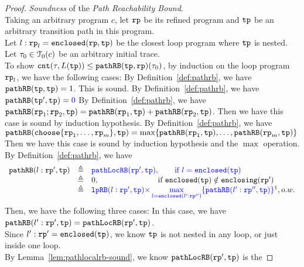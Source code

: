 \begin{proof}
\emph{Soundness} of the \emph{Path Reachability Bound}.
\\
Taking an arbitrary program $c$, let $\mathtt{rp}$ be its refined program and $\mathtt{tp}$ be an arbitrary transition path in this program.
\\
Let $l: \mathtt{rp}_l = \mathtt{enclosed}(\mathtt{rp}, \mathtt{tp})$ be the closest loop program where $\mathtt{tp}$ is nested.
\\
Let $\mathtt{\tau}_0 \in \mathcal{T}_0(c)$ be an arbitrary initial trace.
\\
To show $\mathtt{cnt}(\mathtt{\tau}, L(\mathtt{tp})) \leq \mathtt{pathRB}(\mathtt{tp}, \mathtt{rp})(\mathtt{\tau}_0)$, by induction on the loop program $\mathtt{rp}_l$,
we have the following cases:
By Definition~\ref{def:pathrb}, we have $\mathtt{pathRB}(\mathtt{tp}, \mathtt{tp}) = 1$.
This is sound.
By Definition~\ref{def:pathrb}, we have $\inoutB(\tpath', \tpath) = \highlight{0} $
By Definition~\ref{def:pathrb}, we have $\mathtt{pathRB}(\mathtt{rp}_1;\mathtt{rp}_2, \mathtt{tp}) = \mathtt{pathRB}(\mathtt{rp}_1, \mathtt{tp}) + \mathtt{pathRB}(\mathtt{rp}_2, \mathtt{tp}) $.
Then we have this case is sound by induction hypothesis.
By Definition~\ref{def:pathrb}, we have $\inoutB(\rpchoose{\rprog_1, \ldots, \rprog_m }, \tpath) = \max\left\{ \inoutB(\rprog_1, \tpath), \ldots, \inoutB(\rprog_m, \tpath) \right\}$ 
Then we have this case is sound by induction hypothesis and the $\max$ operation.
By Definition~\ref{def:pathrb}, we have 
\[  
  \begin{array}{rcl}
    \inoutB(l: \rprog', \tpath) & \triangleq & 
\highlight{\outinB(\rprog', \tpath), \qquad \text{if } l = \kw{enclosed}(\tpath)}
\\ &  \triangleq & 
0, \qquad \qquad \qquad \quad ~~ \text{if }  \kw{enclosed}(\tpath) \notin \kw{enclosing}(\rprog')
\\ &  \triangleq & 
\highlight{
  \lpchB(l:\rprog', \tpath ) }
\highlight{\times \max\limits_{l = \kw{enclosed}(l':\rprog'')}
\{\inoutB(l':\rprog'', \tpath)\} } \footnotemark, o.w. 
\end{array}
\]
%
Then, we have the following three cases:
In this case, we have $\mathtt{pathRB}(l': \mathtt{rp}', \mathtt{tp}) = {\mathtt{pathLocRB}(\mathtt{rp}', \mathtt{tp})}$.
\\
Since $l': \mathtt{rp}' = \mathtt{enclosed}(\mathtt{tp})$, we know $\mathtt{tp}$ is not nested in any loop, or just inside one loop.
\\
By Lemma~\ref{lem:pathlocalrb-sound}, we know $\mathtt{pathLocRB}(\mathtt{rp}', \mathtt{tp})$ is the

\end{proof}
